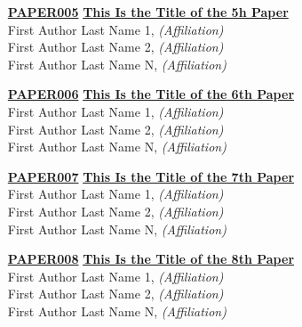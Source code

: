 \begin{enumerate}
\item[\href{https://doi.org/10.1145/1122445.1122456}{\textbf{PAPER005}}]
\href{https://doi.org/10.1145/1122445.1122456}{\textbf{This Is the Title of the 5h Paper}}\\
First Author Last Name 1, \emph{(Affiliation)}\\
First Author Last Name 2, \emph{(Affiliation)}\\
First Author Last Name N, \emph{(Affiliation)}\\

\item[\href{https://doi.org/10.1145/1122445.1122456}{\textbf{PAPER006}}]
\href{https://doi.org/10.1145/1122445.1122456}{\textbf{This Is the Title of the 6th Paper}}\\
First Author Last Name 1, \emph{(Affiliation)}\\
First Author Last Name 2, \emph{(Affiliation)}\\
First Author Last Name N, \emph{(Affiliation)}\\

\item[\href{https://doi.org/10.1145/1122445.1122456}{\textbf{PAPER007}}]
\href{https://doi.org/10.1145/1122445.1122456}{\textbf{This Is the Title of the 7th Paper}}\\
First Author Last Name 1, \emph{(Affiliation)}\\
First Author Last Name 2, \emph{(Affiliation)}\\
First Author Last Name N, \emph{(Affiliation)}\\

\item[\href{https://doi.org/10.1145/1122445.1122456}{\textbf{PAPER008}}]
\href{https://doi.org/10.1145/1122445.1122456}{\textbf{This Is the Title of the 8th Paper}}\\
First Author Last Name 1, \emph{(Affiliation)}\\
First Author Last Name 2, \emph{(Affiliation)}\\
First Author Last Name N, \emph{(Affiliation)}\\
\end{enumerate}


